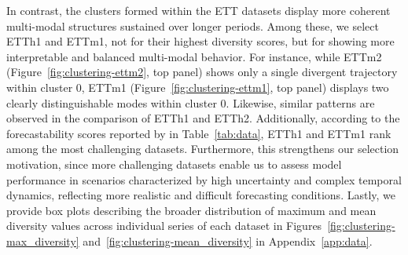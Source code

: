 \documentclass[a4paper,oneside,bibliography=totoc]{scrbook}
\begin{document}
In contrast, the clusters formed within the ETT datasets display more coherent multi-modal structures sustained over longer periods. 
Among these, we select ETTh1 and ETTm1, not for their highest diversity scores, but for showing more interpretable and balanced multi-modal behavior. For instance, while ETTm2 (Figure~\ref{fig:clustering-ettm2}, top panel) shows only a single divergent trajectory within cluster 0, ETTm1 (Figure~\ref{fig:clustering-ettm1}, top panel) displays two clearly distinguishable modes within cluster 0. 
Likewise, similar patterns are observed in the comparison of ETTh1 and ETTh2.
Additionally, according to the forecastability scores reported by \citet{shang_ada-mshyper_2024} in Table~\ref{tab:data}, ETTh1 and ETTm1 rank among the most challenging datasets. 
Furthermore, this strengthens our selection motivation, since more challenging datasets enable us to assess model performance in scenarios characterized by high uncertainty and complex temporal dynamics, reflecting more realistic and difficult forecasting conditions. %
Lastly, we provide box plots describing the broader distribution of maximum and mean diversity values across individual series of each dataset in Figures~\ref{fig:clustering-max_diversity} and~\ref{fig:clustering-mean_diversity} in Appendix~\ref{app:data}.
%
\end{document}

